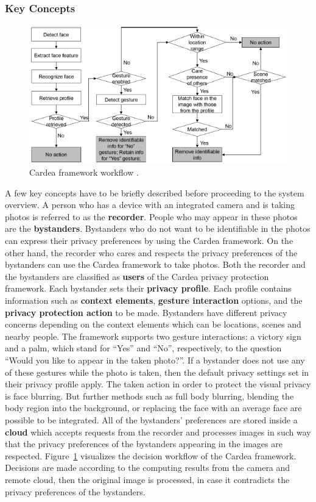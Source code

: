 \documentclass[conference]{IEEEtran}
\begin{document}
\subsubsection{Key Concepts}
\begin{figure}[t]
\centerline{\includegraphics[width=.5\textwidth]{img/cardea_workflow.png}}
\caption{Cardea framework workflow \cite{shu2016cardea}.}
\label{fig:cardea}
\end{figure}

A few key concepts have to be briefly described before proceeding to the system overview. A person who has a device with an integrated camera and is taking photos is referred to as the \textbf{recorder}. People who may appear in these photos are the \textbf{bystanders}. Bystanders who do not want to be identifiable in the photos can express their privacy preferences by using the Cardea framework. On the other hand, the recorder who cares and respects the privacy preferences of the bystanders can use the Cardea framework to take photos. Both the recorder and the bystanders are classified as \textbf{users} of the Cardea privacy protection framework. Each bystander sets their \textbf{privacy profile}. Each profile contains information such as \textbf{context elements}, \textbf{gesture interaction} options, and the \textbf{privacy protection action} to be made. Bystanders have different privacy concerns depending on the context elements which can be locations, scenes and nearby people. The framework supports two gesture interactions: a victory sign and a palm, which stand for “Yes” and “No”, respectively, to the question “Would you like to appear in the taken photo?”. If a bystander does not use any of these gestures while the photo is taken, then the default privacy settings set in their privacy profile apply. The taken action in order to protect the visual privacy is face blurring. But further methods such as full body blurring, blending the body region into the background, or replacing the face with an average face are possible to be integrated. All of the bystanders' preferences are stored inside a \textbf{cloud} which accepts requests from the recorder and processes images in such way that the privacy preferences of the bystanders appearing in the images are respected. Figure~\ref{fig:cardea} visualizes the decision workflow of the Cardea framework. Decisions are made according to the computing results from the camera and remote cloud, then the original image is processed, in case it contradicts the privacy preferences of the bystanders. 
\end{document}
